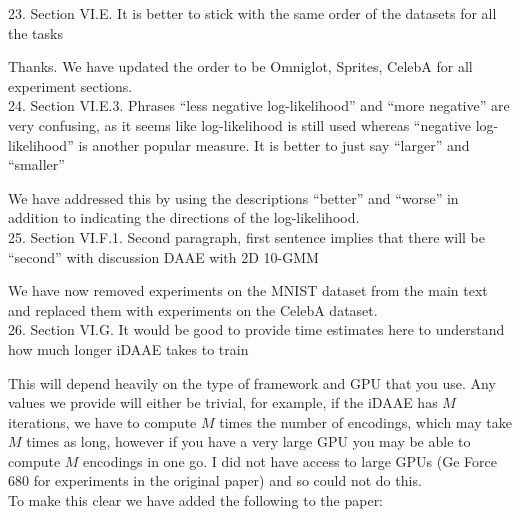 \documentclass[a4paper,11pt]{article}
\begin{document}




{\color{blue}
23. Section VI.E. It is better to stick with the same order of the datasets for all the tasks\\
}

Thanks. We have updated the order to be Omniglot, Sprites, CelebA for all experiment sections.\\

{\color{blue}
24. Section VI.E.3. Phrases ``less negative log-likelihood'' and ``more negative'' are very confusing, as it seems like log-likelihood is still used whereas ``negative log-likelihood'' is another popular measure. It is better to just say ``larger'' and ``smaller''\\
}

We have addressed this by using the descriptions ``better'' and ``worse'' in addition to indicating the directions of the log-likelihood.\\

{\color{blue}
25. Section VI.F.1. Second paragraph, first sentence implies that there will be ``second'' with discussion DAAE with 2D 10-GMM\\
}

We have now removed experiments on the MNIST dataset from the main text and replaced them with experiments on the CelebA dataset. \\

{\color{blue}
26. Section VI.G. It would be good to provide time estimates here to understand how much longer iDAAE takes to train\\
}

This will depend heavily on the type of framework and GPU that you use. Any values we provide will either be trivial, for example, if the iDAAE has $M$ iterations, we have to compute $M$ times the number of encodings, which may take $M$ times as long, however if you have a very large GPU you may be able to compute $M$ encodings in one go. I did not have access to large GPUs (Ge Force 680 for experiments in the original paper) and so could not do this.\\

To make this clear we have added the following to the paper:
\end{document}
